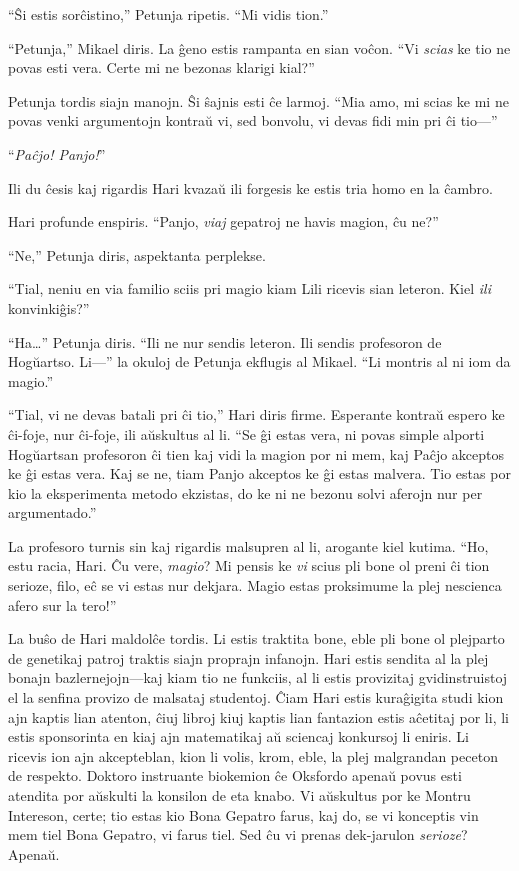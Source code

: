 “Ŝi estis sorĉistino,” Petunja ripetis.
“Mi vidis tion.”

“Petunja,” Mikael diris.
La ĝeno estis rampanta en sian voĉon.
“Vi \emph{scias} ke tio ne povas esti vera.
Certe mi ne bezonas klarigi kial?”

Petunja tordis siajn manojn.
Ŝi ŝajnis esti ĉe larmoj.
“Mia amo, mi scias ke mi ne povas venki argumentojn kontraŭ vi, sed bonvolu, vi devas fidi min pri ĉi tio—”

“\emph{Paĉjo! Panjo!}”

Ili du ĉesis kaj rigardis Hari kvazaŭ ili forgesis ke estis tria homo en la ĉambro.

Hari profunde enspiris.
“Panjo, \emph{viaj} gepatroj ne havis magion, ĉu ne?”

“Ne,” Petunja diris, aspektanta perplekse.

“Tial, neniu en via familio sciis pri magio kiam Lili ricevis sian leteron.
Kiel \emph{ili} konvinkiĝis?”

“Ha…” Petunja diris.
“Ili ne nur sendis leteron.
Ili sendis profesoron de Hogŭartso.
Li—” la okuloj de Petunja ekflugis al Mikael.
“Li montris al ni iom da magio.”

“Tial, vi ne devas batali pri ĉi tio,” Hari diris firme.
Esperante kontraŭ espero ke ĉi-foje, nur ĉi-foje, ili aŭskultus al li.
“Se ĝi estas vera, ni povas simple alporti Hogŭartsan profesoron ĉi tien kaj vidi la magion por ni mem, kaj Paĉjo akceptos ke ĝi estas vera.
Kaj se ne, tiam Panjo akceptos ke ĝi estas malvera.
Tio estas por kio la eksperimenta metodo ekzistas, do ke ni ne bezonu solvi aferojn nur per argumentado.”

La profesoro turnis sin kaj rigardis malsupren al li, arogante kiel kutima.
“Ho, estu racia, Hari.
Ĉu vere, \emph{magio}?
Mi pensis ke \emph{vi} scius pli bone ol preni ĉi tion serioze, filo, eĉ se vi estas nur dekjara.
Magio estas proksimume la plej nescienca afero sur la tero!”

La buŝo de Hari maldolĉe tordis.
Li estis traktita bone, eble pli bone ol plejparto de genetikaj patroj traktis siajn proprajn infanojn.
Hari estis sendita al la plej bonajn bazlernejojn—kaj kiam tio ne funkciis, al li estis provizitaj gvidinstruistoj el la senfina provizo de malsataj studentoj.
Ĉiam Hari estis kuraĝigita studi kion ajn kaptis lian atenton, ĉiuj libroj kiuj kaptis lian fantazion estis aĉetitaj por li, li estis sponsorinta en kiaj ajn matematikaj aŭ sciencaj konkursoj li eniris.
Li ricevis ion ajn akcepteblan, kion li volis, krom, eble, la plej malgrandan peceton de respekto.
Doktoro instruante biokemion ĉe Oksfordo apenaŭ povus esti atendita por aŭskulti la konsilon de eta knabo.
Vi aŭskultus por ke Montru Intereson, certe; tio estas kio Bona Gepatro farus, kaj do, se vi konceptis vin mem tiel Bona Gepatro, vi farus tiel.
Sed ĉu vi prenas dek-jarulon \emph{serioze}?
Apenaŭ.


